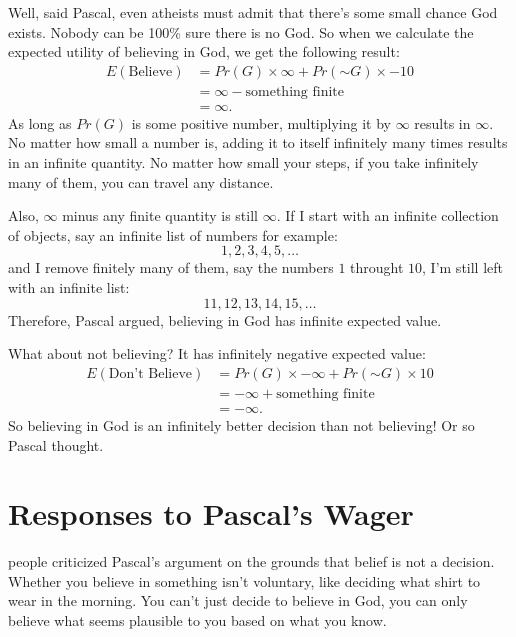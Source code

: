 \documentclass[justified]{tufte-book}
\renewcommand{\neg}{\mathbin{\sim}}
\newcommand{\p}{Pr}
\newcommand{\E}{E}
\theoremstyle{definition}
\theoremstyle{definition}
\theoremstyle{definition}
\theoremstyle{remark}
\begin{document}
Well, said Pascal, even atheists must admit that there's some small
chance God exists. Nobody can be 100\% sure there is no God. So when we
calculate the expected utility of believing in God, we get the following
result: \[
  \begin{aligned}
    \E(\mbox{Believe}) &= \p(G) \times \infty + \p(\neg G) \times -10\\
                       &= \infty - \mbox{something finite}\\
                       &= \infty.
  \end{aligned}
\] As long as \(\p(G)\) is some positive number, multiplying it by
\(\infty\) results in \(\infty\). No matter how small a number is,
adding it to itself infinitely many times results in an infinite
quantity. No matter how small your steps, if you take infinitely many of
them, you can travel any distance.

Also, \(\infty\) minus any finite quantity is still \(\infty\). If I
start with an infinite collection of objects, say an infinite list of
numbers for example: \[ 1, 2, 3, 4, 5, \ldots \] and I remove finitely
many of them, say the numbers \(1\) throught \(10\), I'm still left with
an infinite list: \[ 11, 12, 13, 14, 15, \ldots \] Therefore, Pascal
argued, believing in God has infinite expected value.

What about not believing? It has infinitely negative expected value: \[
\begin{aligned}
    \E(\mbox{Don't Believe}) &= \p(G) \times -\infty + \p(\neg G) \times 10\\
                             &= -\infty + \mbox{something finite}\\
                             &= -\infty.
  \end{aligned}
\] So believing in God is an infinitely better decision than not
believing! Or so Pascal thought.

\hypertarget{responses-to-pascals-wager}{%
\section{Responses to Pascal's Wager}\label{responses-to-pascals-wager}}

 people criticized Pascal's argument on the grounds
that belief is not a decision. Whether you believe in something isn't
voluntary, like deciding what shirt to wear in the morning. You can't
just decide to believe in God, you can only believe what seems plausible
to you based on what you know.
\end{document}
